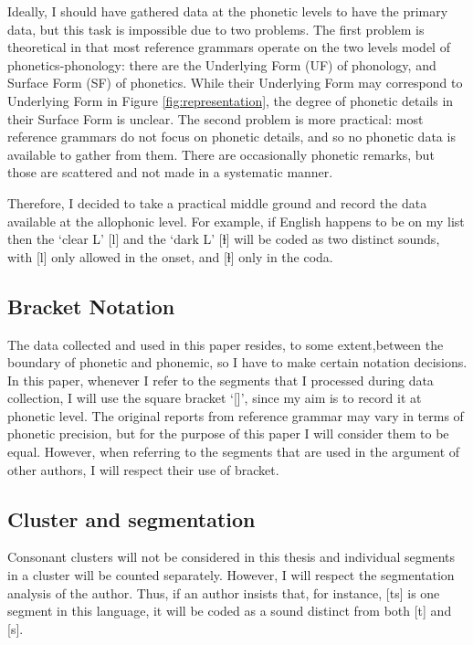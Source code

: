 Ideally, I should have gathered data at the phonetic levels to have the primary data, but this task is impossible due to two problems.
The first problem is theoretical in that most reference grammars operate on the two levels model of phonetics-phonology: there are the Underlying Form (UF) of phonology, and Surface Form (SF) of phonetics. 
While their Underlying Form may correspond to Underlying Form in Figure \ref{fig:representation}, the degree of phonetic details in their Surface Form is unclear.
The second problem is more practical: most reference grammars do not focus on phonetic details, and so no phonetic data is available to gather from them. 
There are occasionally phonetic remarks, but those are scattered and not made in a systematic manner.

\par
Therefore, I decided to take a practical middle ground and record the data available at the allophonic level. 
For example, if English happens to be on my list then the `clear L' [l] and the `dark L' [ɫ] will be coded as two distinct sounds, with [l] only allowed in the onset, and [ɫ] only in the coda. 

\subsection{Bracket Notation}

The data collected and used in this paper resides, to some extent,between the boundary of phonetic and phonemic, so I have to make certain notation decisions.
In this paper, whenever I refer to the segments that I processed during data collection, I will use the square bracket `[]', since my aim is to record it at phonetic level.
The original reports from reference grammar may vary in terms of phonetic precision, but for the purpose of this paper I will consider them to be equal.
However, when referring to the segments that are used in the argument of other authors, I will respect their use of bracket.

\subsection{Cluster and segmentation}

Consonant clusters will not be considered in this thesis and individual segments in a cluster will be counted separately. However, I will respect the segmentation analysis of the author. Thus, if an author insists that, for instance, [ts] is one segment in this language, it will be coded as a sound distinct from both [t] and [s].

